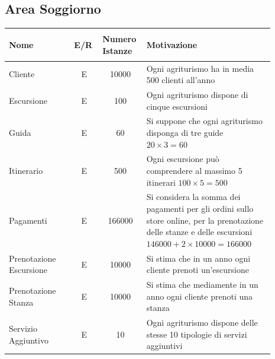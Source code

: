 \documentclass[12pt,a4paper]{article}
\begin{document}
\subsection{Area Soggiorno}
\begin{center}\setlength{\extrarowheight}{1.5pt}\begin{longtable}{|p{0.23\linewidth}|p{0.1\linewidth}|p{0.11\linewidth}|p{0.45\linewidth}|}
\hline \textbf{Nome}   & \begin{center}\vspace{-15pt}\textbf{E/R}\end{center} & \textbf{Numero Istanze} & \textbf{Motivazione}\\ 

    
\hline
Cliente
 & 
\multicolumn{1}{|c|}{E}
 & 
\multicolumn{1}{|c|}{10000}
 & 
Ogni agriturismo ha in media 500 clienti all'anno
\\

\hline
Escursione
 & 
\multicolumn{1}{|c|}{E}
 & 
\multicolumn{1}{|c|}{100}
 & 
Ogni agriturismo dispone di cinque escursioni
\\

\hline
Guida
 & 
\multicolumn{1}{|c|}{E}
 & 
\multicolumn{1}{|c|}{60}
 & 
Si suppone che ogni agriturismo disponga di tre guide $20\times 3= 60$
\\

\hline
Itinerario
 & 
\multicolumn{1}{|c|}{E}
 & 
\multicolumn{1}{|c|}{500}
 & 
Ogni escursione può comprendere al massimo 5 itinerari $100\times 5= 500$
\\

\hline
Pagamenti
 & 
\multicolumn{1}{|c|}{E}
 & 
\multicolumn{1}{|c|}{166000}
 & 
Si considera la somma dei pagamenti per gli ordini sullo store online, per la prenotazione delle stanze e delle escursioni $146000+2\times 10000= 166000$
\\

\hline
Prenotazione Escursione
 & 
\multicolumn{1}{|c|}{E}
 & 
\multicolumn{1}{|c|}{10000}
 & 
Si stima che in un anno ogni cliente prenoti un'escursione 
\\

\hline
Prenotazione Stanza
 & 
\multicolumn{1}{|c|}{E}
 & 
\multicolumn{1}{|c|}{10000}
 & 
Si stima che mediamente in un anno ogni cliente prenoti una stanza
\\

\hline
Servizio Aggiuntivo
 & 
\multicolumn{1}{|c|}{E}
 & 
\multicolumn{1}{|c|}{10}
 & 
Ogni agriturismo dispone delle stesse 10 tipologie di servizi aggiuntivi
\\


\end{longtable}
\end{center}
\end{document}

